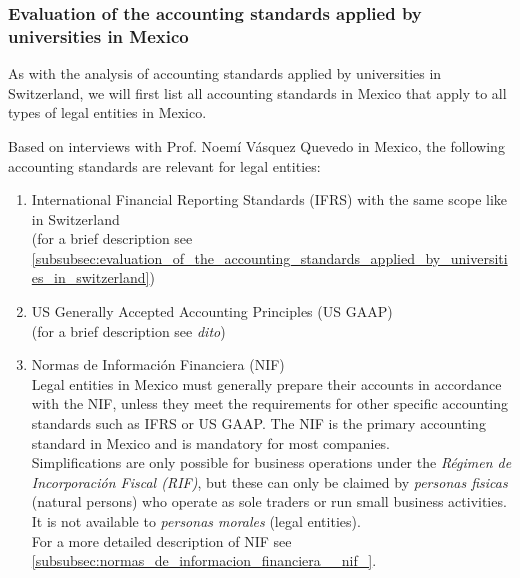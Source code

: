 \documentclass[10pt]{article}
\begin{document}
\subsubsection{Evaluation of the accounting standards applied by universities in Mexico}\label{subsubsec:evaluation_of_the_accounting_standards_applied_by_universities_in_mexico}
As with the analysis of accounting standards applied by universities in Switzerland, we will first list all accounting standards in Mexico that apply to all types of legal entities in Mexico.

Based on interviews with Prof. Noemí Vásquez Quevedo in Mexico, the following accounting standards are relevant for legal entities:

\begin{enumerate}
    \item International Financial Reporting Standards (IFRS) with the same scope like in Switzerland \\
(for a brief description see \vref{subsubsec:evaluation_of_the_accounting_standards_applied_by_universities_in_switzerland})

    \item US Generally Accepted Accounting Principles (US GAAP)\\
(for a brief description see \textit{dito})

    \item Normas de Información Financiera (NIF)\\
Legal entities in Mexico must generally prepare their accounts in accordance with the NIF, unless they meet the requirements for other specific accounting standards such as IFRS or US GAAP. The NIF is the primary accounting standard in Mexico and is mandatory for most companies.\\
Simplifications are only possible for business operations under the \textit{Régimen de Incorporación Fiscal (RIF)}, but these can only be claimed by \textit{personas fisicas} (natural persons) who operate as sole traders or run small business activities. It is not available to \textit{personas morales} (legal entities).\\
For a more detailed description of NIF see \vref{subsubsec:normas_de_informacion_financiera__nif_}.


\end{enumerate}
\end{document}
